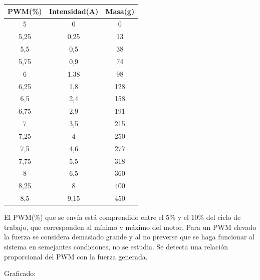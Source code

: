 \documentclass[twoside,11pt]{report}
\begin{document}
\begin{center}
\begin{tabular}{|c|c|c|}
\hline
\textbf{PWM(\%)} & \textbf{Intensidad(A)} & \textbf{Masa(g)} \\
\hline
\hline
5    &	  0 &   0 \\
\hline
5,25 & 0,25 &  13 \\
\hline
5,5	 &  0,5 &  38 \\
\hline
5,75 &  0,9 &  74 \\
\hline
6    & 1,38 &  98 \\
\hline
6,25	 &  1,8 & 128 \\
\hline
6,5  &	2,4 & 158 \\
\hline
6,75 & 	2,9 & 191 \\
\hline
7    &	3,5 & 215 \\
\hline
7,25 &  	  4	& 250 \\
\hline
7,5  & 	4,6 & 277 \\
\hline
7,75	 &  5,5 & 318 \\
\hline
8    &	6,5	& 360 \\
\hline
8,25 &    8 & 400 \\
\hline
8,5  & 9,15 & 450 \\
\hline
\end{tabular}
\end{center}
El PWM(\%) que se envía está comprendido entre el 5\% y el 10\% del ciclo de trabajo, que corresponden al mínimo y máximo del motor. Para un PWM elevado la fuerza se considera demasiado grande y al no preverse que se haga funcionar al sistema en semejantes condiciones, no se estudia. Se detecta una relación proporcional del PWM con la fuerza generada.

Graficado: 

\begin{figure}[ht]
\begin{center}
\end{center}
\end{figure}
\end{document}
